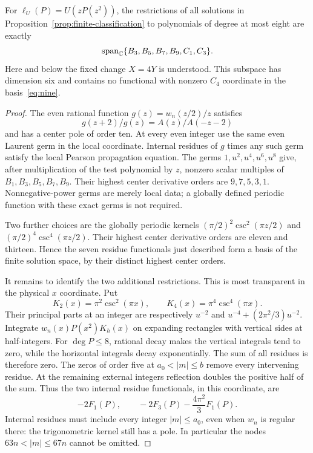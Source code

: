 \begin{proposition}\label{prop:finite-restrictions}
For $\ell_U(P)=U(zP(z^2))$, the restrictions of all solutions in
Proposition~\ref{prop:finite-classification} to polynomials of degree at
most eight are exactly
\begin{equation}\label{eq:finite-span}
 \operatorname{span}_{\mathbb C}\{B_3,B_5,B_7,B_9,C_1,C_3\}.
\end{equation}
Here and below the fixed change $X=4Y$ is understood.  This subspace has
dimension six and contains no functional with nonzero $C_4$ coordinate
in the basis~\eqref{eq:nine}.
\end{proposition}
\begin{proof}
The even rational function $g(z)=w_n(z/2)/z$ satisfies
\[
 g(z+2)/g(z)=A(z)/A(-z-2)
\]
and has a center pole of order ten.  At every even integer use the same
even Laurent germ in the local coordinate.  Internal residues of $g$
times any such germ satisfy the local Pearson propagation equation.
The germs $1,u^2,u^4,u^6,u^8$ give, after multiplication of the test
polynomial by $z$, nonzero scalar multiples of $B_1,B_3,B_5,B_7,B_9$.
Their highest center derivative orders are $9,7,5,3,1$.
Nonnegative-power germs are merely local data; a globally defined
periodic function with these exact germs is not required.

Two further choices are the globally periodic kernels
$(\pi/2)^2\csc^2(\pi z/2)$ and $(\pi/2)^4\csc^4(\pi z/2)$.
Their highest center derivative orders are eleven and thirteen.  Hence
the seven residue functionals just described form a basis of the finite
solution space, by their distinct highest center orders.

It remains to identify the two additional restrictions.  This is most
transparent in the physical $x$ coordinate.  Put
\[
 K_2(x)=\pi^2\csc^2(\pi x),\qquad
 K_4(x)=\pi^4\csc^4(\pi x).
\]
Their principal parts at an integer are respectively $u^{-2}$ and
$u^{-4}+(2\pi^2/3)u^{-2}$.  Integrate
$w_n(x)P(x^2)K_h(x)$ on expanding rectangles with vertical sides
at half-integers.  For $\deg P\le8$, rational decay makes the vertical
integrals tend to zero, while the horizontal integrals decay
exponentially.  The sum of all residues is therefore zero.  The zeros
of order five at $a_0<|m|\le b$ remove every intervening residue.
At the remaining external integers reflection doubles the positive
half of the sum.  Thus the two internal residue functionals, in this
coordinate, are
\begin{equation}\label{eq:kernel-residues}
 -2F_1(P),\qquad -2F_3(P)-\frac{4\pi^2}{3}F_1(P).
\end{equation}
Internal residues must include every integer $|m|\le a_0$, even when
$w_n$ is regular there: the trigonometric kernel still has a pole.
In particular the nodes $63n<|m|\le67n$ cannot be omitted.


\end{proof}
